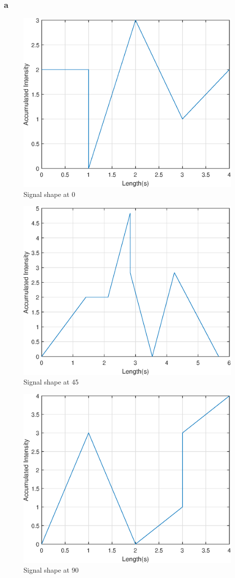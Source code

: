 \subsubsection*{a}
\begin{figure}[!htb]
    \centering
    \includegraphics[width=.4\linewidth]{./midterm/img/3.eps}
    \caption{Signal shape at 0\textdegree}
    \label{fig:0}
\end{figure}
\begin{figure}[!htb]
    \centering
    \includegraphics[width=.4\linewidth]{./midterm/img/1.eps}
    \caption{Signal shape at 45\textdegree}
    \label{fig:45}
\end{figure}
\begin{figure}[!htb]
    \centering
    \includegraphics[width=.4\linewidth]{./midterm/img/2.eps}
    \caption{Signal shape at 90\textdegree}
    \label{fig:90}
\end{figure}
\clearpage
